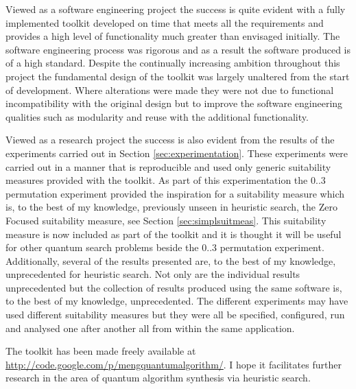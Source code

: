 Viewed as a software engineering project the success is quite evident with a fully implemented toolkit developed on time that meets all the requirements and provides a high level of functionality much greater than envisaged initially.
The software engineering process was rigorous and as a result the software produced is of a high standard.
Despite the continually increasing ambition throughout this project the fundamental design of the toolkit was largely unaltered from the start of development.
Where alterations were made they were not due to functional incompatibility with the original design but to improve the software engineering qualities such as modularity and reuse with the additional functionality.

Viewed as a research project the success is also evident from the results of the experiments carried out in Section \ref{sec:experimentation}.
These experiments were carried out in a manner that is reproducible and used only generic suitability measures provided with the toolkit.
As part of this experimentation the $0..3$ permutation experiment provided the inspiration for a suitability measure which is, to the best of my knowledge,  previously unseen in heuristic search, the Zero Focused suitability measure, see Section \ref{sec:simplsuitmeas}.
This suitability measure is now included as part of the toolkit and it is thought it will be useful for other quantum search problems beside the $0..3$ permutation experiment.
Additionally, several of the results presented are, to the best of my knowledge, unprecedented for heuristic search.
Not only are the individual results unprecedented but the collection of results produced using the same software is, to the best of my knowledge, unprecedented.
The different experiments may have used different suitability measures but they were all be specified, configured, run and analysed one after another all from within the same application.

The toolkit has been made freely available at \url{http://code.google.com/p/mengquantumalgorithm/}.
I hope it facilitates further research in the area of quantum algorithm synthesis via heuristic search.
